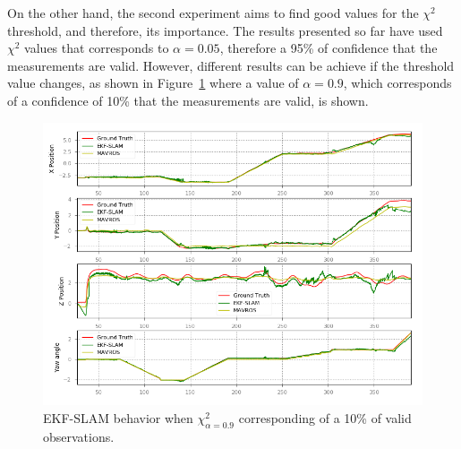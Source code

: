 On the other hand, the second experiment aims to find good values for the $\chi^2$ threshold, and therefore, its importance. The results presented so far have used $\chi^2$ values that corresponds to $\alpha=0.05$, therefore a 95\% of confidence that the measurements are valid. However, different results can be achieve if the threshold value changes, as shown in Figure~\ref{fig:chapter3:simulation:d:nees-10} where a value of $\alpha=0.9$, which corresponds of a confidence of 10\% that the measurements are valid, is shown.\\
\begin{figure}
    \centering
    \includegraphics[width=\textwidth]{Images/fig24-nees-10-path.png}
    \caption[EKF-SLAM behavior when $\chi_{\alpha=0.9}^2$]{EKF-SLAM behavior when $\chi_{\alpha=0.9}^2$ corresponding of a 10\% of valid observations.}
    \label{fig:chapter3:simulation:d:nees-10}
\end{figure}

